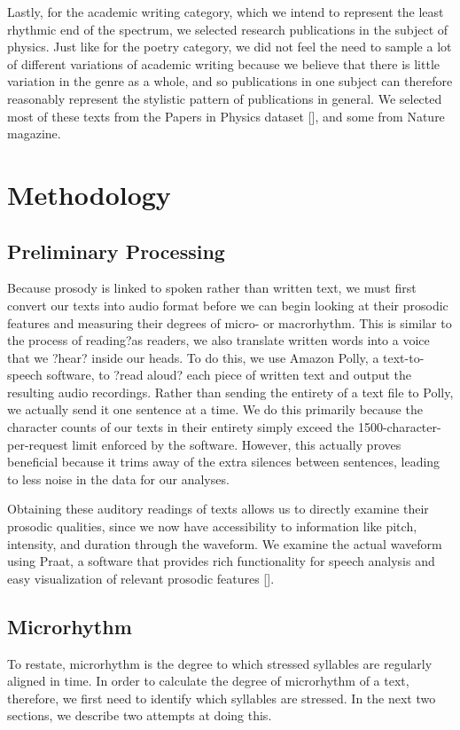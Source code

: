 \documentclass[pageno]{jpaper}
\begin{document}
Lastly, for the academic writing category, which we intend to represent the least rhythmic end of the spectrum, we selected research publications in the subject of physics. Just like for the poetry category, we did not feel the need to sample a lot of different variations of academic writing because we believe that there is little variation in the genre as a whole, and so  publications in one subject can therefore reasonably represent the stylistic pattern of publications in general. We selected most of these texts from the Papers in Physics dataset [], and some from Nature magazine.  



\section{Methodology}
\subsection{Preliminary Processing}
Because prosody is linked to spoken rather than written text, we must first convert our texts into audio format before we can begin looking at their prosodic features and measuring their degrees of micro- or macrorhythm. This is similar to the process of reading?as readers, we also translate written words into a voice that we ?hear? inside our heads. To do this, we use Amazon Polly, a text-to-speech software, to ?read aloud? each piece of written text and output the resulting audio recordings. Rather than sending the entirety of a text file to Polly, we actually send it one sentence at a time. We do this primarily because the character counts of our texts in their entirety simply exceed the 1500-character-per-request limit enforced by the software. However, this actually proves beneficial because it trims away of the extra silences between sentences, leading to less noise in the data for our analyses. 

Obtaining these auditory readings of texts allows us to directly examine their prosodic qualities, since we now have accessibility to information like pitch, intensity, and duration through the waveform. We examine the actual waveform using Praat, a software that provides rich functionality for speech analysis and easy visualization of relevant prosodic features []. 

\subsection{Microrhythm}
To restate, microrhythm is the degree to which stressed syllables are regularly aligned in time. In order to calculate the degree of microrhythm of a text, therefore, we first need to identify which syllables are stressed. In the next two sections, we describe two attempts at doing this.
\end{document}
